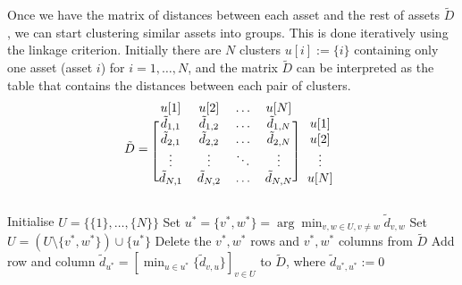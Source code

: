         Once we have the matrix of distances between each asset and the rest of assets $\tilde{D}$, we can start clustering similar assets into groups. This is done iteratively using the linkage criterion. Initially there are $N$ clusters $u[i] := \{ i \}$ containing only one asset (asset $i$) for $i=1, \dots, N$, and the matrix $\tilde{D}$ can be interpreted as the table that contains the distances between each pair of clusters.
        \begin{align*}
            \tilde{D} = \begin{blockarray}{ccccc}
                            u[1] & u[2] & \dots & u[N] \\
                                \begin{block}{[cccc]c}
                                  \tilde{d}_{1,1} & \tilde{d}_{1,2} & \dots & \tilde{d}_{1,N} & u[1] \\
                                  \tilde{d}_{2,1} & \tilde{d}_{2,2} & \dots & \tilde{d}_{2,N} & u[2] \\
                                  \vdots & \vdots & \ddots & \vdots & \vdots \\
                                  \tilde{d}_{N,1} & \tilde{d}_{N,2} & \dots & \tilde{d}_{N,N} & u[N] \\
                                \end{block}
                            \end{blockarray}
        \end{align*}
        
        \begin{algorithm}[H]\label{algorithm:TreeClustering}
            \SetAlgoLined
            
            Initialise $U = \{ \{1 \}, \dots, \{ N \} \}$\;
                {
                Set $u^* = \{ v^*, w^* \} = \arg\min_{v, w \in U, v \neq w} \tilde{d}_{v,w}$ 
                Set $U = (U \setminus \{ v^*, w^* \}) \cup \{ u^* \}$\;
                Delete the $v^*, w^*$ rows and $v^*, w^*$ columns from $\tilde{D}$\;
                Add row and column $\tilde{d}_{u^*} = \left[ \min_{u \in u^*} \{ \tilde{d}_{v,u} \} \right]_{v \in U}$ to $\tilde{D}$, where $\tilde{d}_{u^*,u^*} := 0$
                }
            
            \caption{Tree Clustering Algorithm}
        \end{algorithm}
        ~\
        
